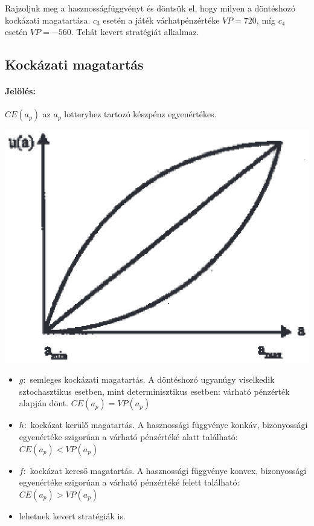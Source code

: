 \documentclass[a4paper,12pt]{article}
\begin{document}
Rajzoljuk meg a hasznosságfüggvényt és döntsük el, hogy milyen a döntéshozó kockázati magatartása. $c_3$ esetén a játék várhatpénzértéke $VP=720$, míg $c_4$ esetén $VP=-560$. Tehát kevert stratégiát alkalmaz.

\subsection{Kockázati magatartás}

\paragraph{Jelölés: } $CE(a_p)$ az $a_p$ lotteryhez tartozó készpénz egyenértékes. 

\begin{center}

\includegraphics[scale=0.7]{kockazat}
\\
\end{center}

\begin{itemize}
\item $g:$ semleges kockázati magatartás. A döntéshozó ugyanúgy viselkedik sztochasztikus esetben, mint determinisztikus esetben: várható pénzérték alapján dönt. $CE(a_p) = VP(a_p)$
\item $h:$ kockázat kerülő magatartás. A hasznossági függvénye konkáv, bizonyossági egyenértéke szigorúan a várható pénzértéké alatt található: $CE(a_p) < VP(a_p)$
\item $f:$ kockázat kereső magatartás. A hasznossági függvénye konvex, bizonyossági egyenértéke szigorúan a várható pénzértéké felett található: $CE(a_p) > VP(a_p)$
\item lehetnek kevert stratégiák is.
\end{itemize}
\end{document}
